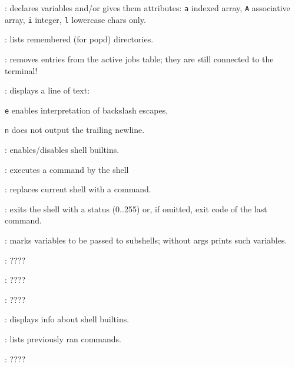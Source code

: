\begin{compactenum}
\item [\symbolbash] : declares variables and/or gives them attributes: \texttt{a} indexed array, \texttt{A} associative array, \texttt{i} integer, \texttt{l} lowercase chars only.

\item [\symbolbash] : lists remembered (for popd) directories.

\item [\symbolbash] : removes entries from the active jobs table; they are still connected to the terminal!

\item [\symbolbash] : displays a line of text:
\item [\texttt{e}] enables interpretation of backslash escapes,
\item [\texttt{n}] does not output the trailing newline.

\item [\symbolbash] : enables/disables shell builtins.

\item [\symbolbash] : executes a command by the shell

\item [\symbolbash] : replaces current shell with a command.

\item [\symbolbash] : exits the shell with a status (0..255) or, if omitted, exit code of the last command.

\item [\symbolbash] : marks variables to be passed to subshells; without args prints such variables.

\item [\symbolbash] : \dotfill ????

\item [\symbolbash] : \dotfill ????

\item [\symbolbash] : \dotfill ????

\item [\symbolbash] : displays info about shell builtins.

\item [\symbolbash] : lists previously ran commands.

\item [\symbolbash] : \dotfill ????


\end{compactenum}
